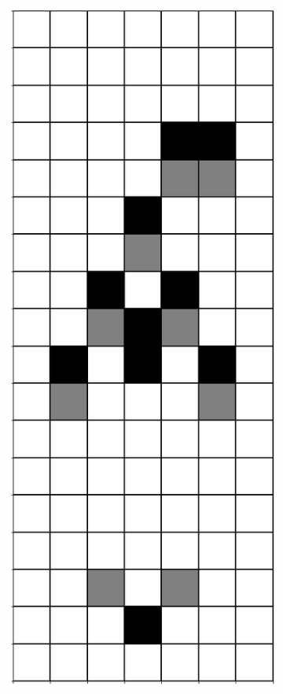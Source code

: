 \documentclass[12pt]{article}
\numberwithin{figure}{section} %
\begin{document}
\begin{figure}[H]
\begin{subfigure}{0.19\textwidth}
     \subcaption{}
   \end{subfigure}
        \begin{subfigure}{0.19\textwidth}
     \centering
     \includegraphics[width=\linewidth]{Section4/18.2}

\end{subfigure}
\end{figure}
\end{document}
